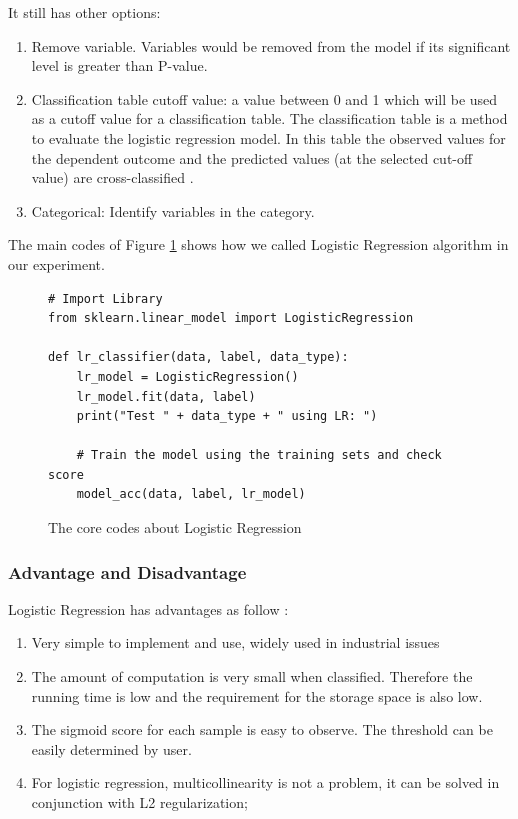 \documentclass[sigconf]{acmart}
\begin{document}
It still has other options:
\begin{enumerate}
    \item Remove variable. Variables would be removed from the model if its significant level is greater than P-value.
    \item Classification table cutoff value: a value between 0 and 1 which will be used as a cutoff value for a classification table. The classification table is a method to evaluate the logistic regression model. In this table the observed values for the dependent outcome and the predicted values (at the selected cut-off value) are cross-classified \cite{lr.form}.
    \item Categorical: Identify variables in the category.
\end{enumerate}

The main codes of Figure \ref{fig:lr} shows how we called Logistic Regression algorithm in our experiment.

\begin{figure}[htb]
\centering
\begin{lstlisting}
# Import Library
from sklearn.linear_model import LogisticRegression

def lr_classifier(data, label, data_type):
    lr_model = LogisticRegression()
    lr_model.fit(data, label)
    print("Test " + data_type + " using LR: ")
    
    # Train the model using the training sets and check score
    model_acc(data, label, lr_model)
\end{lstlisting}
\caption{The core codes about Logistic Regression}\label{fig:lr}
\end{figure}

\subsubsection{Advantage and Disadvantage}

Logistic Regression has advantages as follow \cite{LR}:
\begin{enumerate}
    \item Very simple to implement and use, widely used in industrial issues
    \item The amount of computation is very small when classified. Therefore the running time is low and the requirement for the storage space is also low.
    \item The sigmoid score for each sample is easy to observe. The threshold can be easily determined by user.
    \item For logistic regression, multicollinearity is not a problem, it can be solved in conjunction with L2 regularization;
\end{enumerate}
\end{document}
